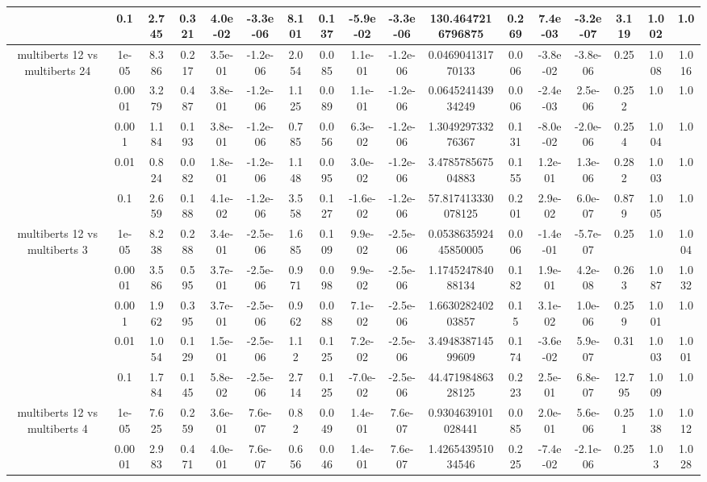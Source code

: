 \begin{tabular}{|c|c|c|c|c|c|c|c|c|c|c|c|c|c|c|c|c|}
 & 0.1 & 2.745 & 0.321 & 4.0e-02 & -3.3e-06 & 8.101 & 0.137 & -5.9e-02 & -3.3e-06 & 130.4647216796875 & 0.269 & 7.4e-03 & -3.2e-07 & 3.119 & 1.002 & 1.0 \\
\hline
\multirow{5}{*}{multiberts 12 vs multiberts 24} & 1e-05 & 8.386 & 0.217 & 3.5e-01 & -1.2e-06 & 2.054 & 0.085 & 1.1e-01 & -1.2e-06 & 0.046904131770133 & 0.006 & -3.8e-02 & -3.8e-06 & 0.25 & 1.008 & 1.016 \\
 & 0.0001 & 3.279 & 0.487 & 3.8e-01 & -1.2e-06 & 1.125 & 0.089 & 1.1e-01 & -1.2e-06 & 0.064524143934249 & 0.006 & -2.4e-03 & 2.5e-06 & 0.252 & 1.0 & 1.0 \\
 & 0.001 & 1.184 & 0.193 & 3.8e-01 & -1.2e-06 & 0.785 & 0.056 & 6.3e-02 & -1.2e-06 & 1.304929733276367 & 0.131 & -8.0e-02 & -2.0e-06 & 0.254 & 1.004 & 1.0 \\
 & 0.01 & 0.824 & 0.082 & 1.8e-01 & -1.2e-06 & 1.148 & 0.095 & 3.0e-02 & -1.2e-06 & 3.478578567504883 & 0.155 & 1.2e-01 & 1.3e-06 & 0.282 & 1.003 & 1.0 \\
 & 0.1 & 2.659 & 0.188 & 4.1e-02 & -1.2e-06 & 3.558 & 0.127 & -1.6e-02 & -1.2e-06 & 57.817413330078125 & 0.201 & 2.9e-02 & 6.0e-07 & 0.879 & 1.005 & 1.0 \\
\hline
\multirow{5}{*}{multiberts 12 vs multiberts 3} & 1e-05 & 8.238 & 0.288 & 3.4e-01 & -2.5e-06 & 1.685 & 0.109 & 9.9e-02 & -2.5e-06 & 0.053863592445850005 & 0.006 & -1.4e-01 & -5.7e-07 & 0.25 & 1.0 & 1.004 \\
 & 0.0001 & 3.586 & 0.595 & 3.7e-01 & -2.5e-06 & 0.971 & 0.098 & 9.9e-02 & -2.5e-06 & 1.174524784088134 & 0.182 & 1.9e-01 & 4.2e-08 & 0.263 & 1.087 & 1.032 \\
 & 0.001 & 1.962 & 0.395 & 3.7e-01 & -2.5e-06 & 0.962 & 0.088 & 7.1e-02 & -2.5e-06 & 1.663028240203857 & 0.15 & 3.1e-02 & 1.0e-06 & 0.259 & 1.001 & 1.0 \\
 & 0.01 & 1.054 & 0.129 & 1.5e-01 & -2.5e-06 & 1.12 & 0.125 & 7.2e-02 & -2.5e-06 & 3.494838714599609 & 0.174 & -3.6e-02 & 5.9e-07 & 0.31 & 1.003 & 1.001 \\
 & 0.1 & 1.784 & 0.145 & 5.8e-02 & -2.5e-06 & 2.714 & 0.125 & -7.0e-02 & -2.5e-06 & 44.47198486328125 & 0.223 & 2.5e-01 & 6.8e-07 & 12.795 & 1.009 & 1.0 \\
\hline
\multirow{5}{*}{multiberts 12 vs multiberts 4} & 1e-05 & 7.625 & 0.259 & 3.6e-01 & 7.6e-07 & 0.82 & 0.049 & 1.4e-01 & 7.6e-07 & 0.9304639101028441 & 0.085 & 2.0e-01 & 5.6e-06 & 0.251 & 1.038 & 1.012 \\
 & 0.0001 & 2.983 & 0.471 & 4.0e-01 & 7.6e-07 & 0.656 & 0.046 & 1.4e-01 & 7.6e-07 & 1.426543951034546 & 0.225 & -7.4e-02 & -2.1e-06 & 0.25 & 1.03 & 1.028 \\

\end{tabular}

